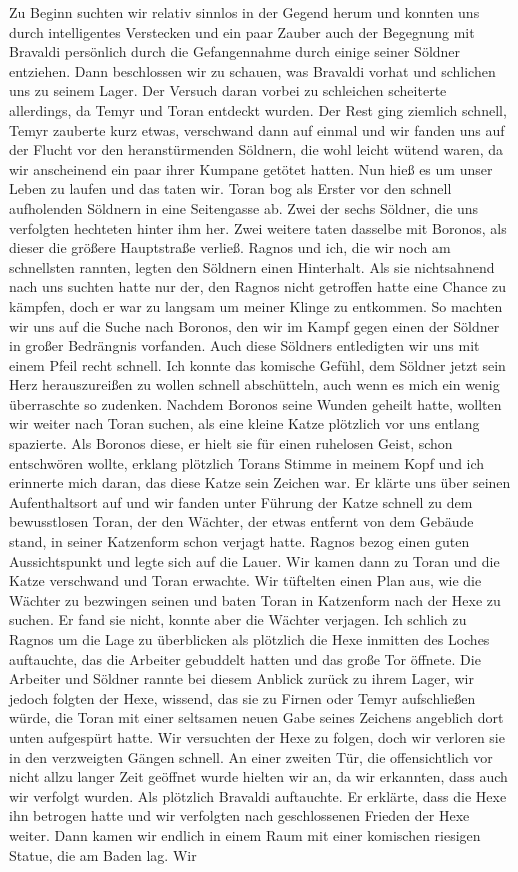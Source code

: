 Zu Beginn suchten wir relativ sinnlos in der Gegend herum und konnten uns durch intelligentes Verstecken und ein paar Zauber auch der Begegnung mit Bravaldi persönlich durch die Gefangennahme durch einige seiner Söldner entziehen. Dann beschlossen wir zu schauen, was Bravaldi vorhat und schlichen uns zu seinem Lager. Der Versuch daran vorbei zu schleichen scheiterte allerdings, da Temyr und Toran entdeckt wurden. Der Rest ging ziemlich schnell, Temyr zauberte kurz etwas, verschwand dann auf einmal und wir fanden uns auf der Flucht vor den heranstürmenden Söldnern, die wohl leicht wütend waren, da wir anscheinend ein paar ihrer Kumpane getötet hatten. Nun hieß es um unser Leben zu laufen und das taten wir. Toran bog als Erster vor den schnell aufholenden Söldnern in eine Seitengasse ab. Zwei der sechs Söldner, die uns verfolgten hechteten hinter ihm her. Zwei weitere taten dasselbe mit Boronos, als dieser die größere Hauptstraße verließ. Ragnos und ich, die wir noch am schnellsten rannten, legten den Söldnern einen Hinterhalt. Als sie nichtsahnend nach uns suchten hatte nur der, den Ragnos nicht getroffen hatte eine Chance zu kämpfen, doch er war zu langsam um meiner Klinge zu entkommen. So machten wir uns auf die Suche nach Boronos, den wir im Kampf gegen einen der Söldner in großer Bedrängnis vorfanden. Auch diese Söldners entledigten wir uns mit einem Pfeil recht schnell. Ich konnte das komische Gefühl, dem Söldner jetzt sein Herz herauszureißen zu wollen schnell abschütteln, auch wenn es mich ein wenig überraschte so zudenken. Nachdem Boronos seine Wunden geheilt hatte, wollten wir weiter nach Toran suchen, als eine kleine Katze plötzlich vor uns entlang spazierte. Als Boronos diese, er hielt sie für einen ruhelosen Geist, schon entschwören wollte, erklang plötzlich Torans Stimme in meinem Kopf und ich erinnerte mich daran, das diese Katze sein Zeichen war. Er klärte uns über seinen Aufenthaltsort auf und wir fanden unter Führung der Katze schnell zu dem bewusstlosen Toran, der den Wächter, der etwas entfernt von dem Gebäude stand, in seiner Katzenform schon verjagt hatte. Ragnos bezog einen guten Aussichtspunkt und legte sich auf die Lauer. Wir kamen dann zu Toran und die Katze verschwand und Toran erwachte. Wir tüftelten einen Plan aus, wie die Wächter zu bezwingen seinen und baten Toran in Katzenform nach der Hexe zu suchen. Er fand sie nicht, konnte aber die Wächter verjagen. Ich schlich zu Ragnos um die Lage zu überblicken als plötzlich die Hexe inmitten des Loches auftauchte, das die Arbeiter gebuddelt hatten und das große Tor öffnete. Die Arbeiter und Söldner rannte bei diesem Anblick zurück zu ihrem Lager, wir jedoch folgten der Hexe, wissend, das sie zu Firnen oder Temyr aufschließen würde, die Toran mit einer seltsamen neuen Gabe seines Zeichens angeblich dort unten aufgespürt hatte. Wir versuchten der Hexe zu folgen, doch wir verloren sie in den verzweigten Gängen schnell. An einer zweiten Tür, die offensichtlich vor nicht allzu langer Zeit geöffnet wurde hielten wir an, da wir erkannten, dass auch wir verfolgt wurden. Als plötzlich Bravaldi auftauchte. Er erklärte, dass die Hexe ihn betrogen hatte und wir verfolgten nach geschlossenen Frieden der Hexe weiter. Dann kamen wir endlich in einem Raum mit einer komischen riesigen Statue, die am Baden lag. Wir 